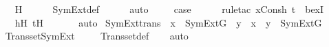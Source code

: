 \begin{isabellebody}
\ \ \ \ \isamarkupfalse%
\ H\isanewline
\ \ \ \ \isamarkupfalse%
\ SymExt{\isacharunderscore}{\kern0pt}def\isanewline
\ \ \ \ \isamarkupfalse%
\ auto\ \isanewline
\ \ \isamarkupfalse%
\ {\isacharquery}{\kern0pt}case\ \isanewline
\ \ \ \ \isamarkupfalse%
{\isacharparenleft}{\kern0pt}rule{\isacharunderscore}{\kern0pt}tac\ x{\isacharequal}{\kern0pt}{\isachardoublequoteopen}Cons{\isacharparenleft}{\kern0pt}h{\isacharprime}{\kern0pt}{\isacharcomma}{\kern0pt}\ t{\isacharprime}{\kern0pt}{\isacharparenright}{\kern0pt}{\isachardoublequoteclose}\ \ bexI{\isacharparenright}{\kern0pt}\isanewline
\ \ \ \ \isamarkupfalse%
\ h{\isacharprime}{\kern0pt}H\ t{\isacharprime}{\kern0pt}H\ \isanewline
\ \ \ \ \isamarkupfalse%
\ auto\isanewline
{}\isamarkupfalse%
%
\endisatagproof
{\isafoldproof}%
%
\isadelimproof
\isanewline
%
\endisadelimproof
\isanewline
{}\isamarkupfalse%
\ SymExt{\isacharunderscore}{\kern0pt}trans\ {\isacharcolon}{\kern0pt}\ {\isachardoublequoteopen}x\ {\isasymin}\ SymExt{\isacharparenleft}{\kern0pt}G{\isacharparenright}{\kern0pt}\ {\isasymLongrightarrow}\ y\ {\isasymin}\ x\ {\isasymLongrightarrow}\ y\ {\isasymin}\ SymExt{\isacharparenleft}{\kern0pt}G{\isacharparenright}{\kern0pt}{\isachardoublequoteclose}\ \isanewline
%
\isadelimproof
\ \ %
\endisadelimproof
%
\isatagproof
{}\isamarkupfalse%
\ Transset{\isacharunderscore}{\kern0pt}SymExt\ \isanewline
\ \ \isamarkupfalse%
\ Transset{\isacharunderscore}{\kern0pt}def\isanewline
\ \ \isamarkupfalse%
\ auto%
\endisatagproof
{\isafoldproof}%
%
\isadelimproof
\isanewline
%
\endisadelimproof
\isanewline
{}\isamarkupfalse%
\isanewline
%
\isadelimtheory
%
\endisadelimtheory
%
\isatagtheory
{}\isamarkupfalse%
%
\endisatagtheory
{\isafoldtheory}%
%
\isadelimtheory
%
\endisadelimtheory
%
\end{isabellebody}%
\endinput
